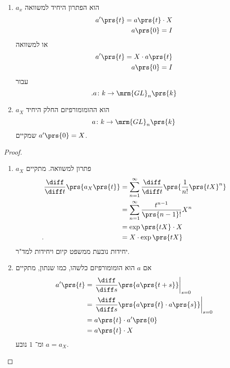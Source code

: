 \documentclass[10pt, twoside]{book}
\begin{document}
\begin{proposition}
\begin{enumerate}
\item $a_x$ הוא הפתרון היחיד למשוואה
\begin{align*}
a'\prs{t} = a\prs{t} \cdot X \\
a\prs{0} = I
\end{align*}
או למשוואה
\begin{align*}
a'\prs{t} = X \cdot a\prs{t} \\
a\prs{0} = I
\end{align*}
עבור
\[ \text{.} a \colon k \to \mrm{GL}_n\prs{k}\]

\item 
$a_X$
הוא ההומומורפיזם החלק היחיד
\[a \colon k \to \mrm{GL}_n\prs{k}\]
שמקיים
$a'\prs{0} = X$.
\end{enumerate}
\end{proposition}

\begin{proof}
\begin{enumerate}
\item $a_X$
פתרון למשוואה. מתקיים
\begin{align*}
\frac{\diff}{\diff t}\prs{a_X\prs{t}} &= \sum_{n=1}^\infty \frac{\diff}{\diff t} \prs{\frac{1}{n!} \prs{tX}^n}
\\&=
\sum_{n=1}^{\infty} \frac{t^{n-1}}{\prs{n-1}!} X^n
\\ &=
\exp\prs{tX} \cdot X
\\ \text{.} \hphantom{\frac{\diff}{\diff t}\prs{a_X\prs{t}}} &=
X \cdot \exp\prs{tX}
\end{align*}
יחידות נובעת ממשפט קיום ויחידות למד"ר.

\item אם
$a$
הוא הומומורפיזם כלשהו, כמו שנתון, מתקיים
\begin{align*}
a'\prs{t} &= \left. \frac{\diff}{\diff s} \prs{a\prs{t+s}} \right|_{s=0}
\\&=
\left. \frac{\diff}{\diff s}\prs{a \prs{t} \cdot a\prs{s}} \right|_{s=0}
\\&=
a\prs{t} \cdot a'\prs{0}
\\&=
a\prs{t} \cdot X
\end{align*}
ומ־%
$1$
נובע
$a = a_X$.
\end{enumerate}
\end{proof}

\end{document}
